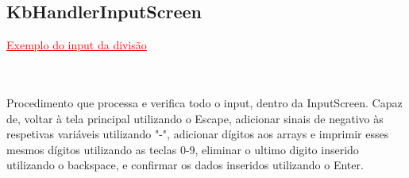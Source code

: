 \subsection{KbHandlerInputScreen} \hfill \textcolor{red}{\underline{Exemplo do input da divisão}}
\titleformat{\subsection}[block]
{\normalfont\large\bfseries}{\thesubsection}{1em}{}\\ \\
Procedimento que processa e verifica todo o input, dentro da InputScreen. Capaz de, voltar à tela principal utilizando o Escape, adicionar sinais de negativo às respetivas variáveis utilizando "-", adicionar dígitos aos arrays e imprimir esses mesmos dígitos utilizando as teclas 0-9, eliminar o ultimo digito inserido utilizando o backspace, e confirmar os dados inseridos utilizando o Enter.
